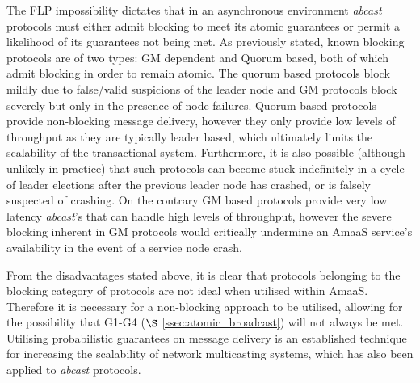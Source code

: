     The FLP impossibility \citep{Fischer:1985:IDC:3149.214121} dictates that in an asynchronous environment \emph{abcast} protocols must either admit blocking to meet its atomic guarantees or permit a likelihood of its guarantees not being met.  As  previously stated, known blocking protocols are of two types: GM dependent and Quorum based, both of which admit blocking in order to remain atomic.  The quorum based protocols block mildly due to false/valid suspicions of the leader node and GM protocols block severely but only in the presence of node failures.  Quorum based protocols provide non-blocking message delivery, however they only provide low levels of throughput as they are typically leader based, which ultimately limits the scalability of the transactional system.  Furthermore, it is also possible (although unlikely in practice) that such protocols can become stuck indefinitely in a cycle of leader elections after the previous leader node has crashed, or is falsely suspected of crashing.    On the contrary GM based protocols provide very low latency \emph{abcast}'s that can handle high levels of throughput, however the severe blocking inherent in GM protocols would critically undermine an \textsf{AmaaS} service's availability in the event of a service node crash.  
    
    From the disadvantages stated above, it is clear that protocols belonging to the blocking category of protocols are not ideal when utilised within \textsf{AmaaS}.  Therefore it is necessary for a non-blocking approach to be utilised, allowing for the possibility that G1-G4 ($\S$ \ref{ssec:atomic_broadcast}) will not always be met.  Utilising probabilistic guarantees on message delivery is an established technique for increasing the scalability of network multicasting systems\citep{Kermarrec:2003:PRD:766617.766623}, which has also been applied to \emph{abcast} protocols.  
    
